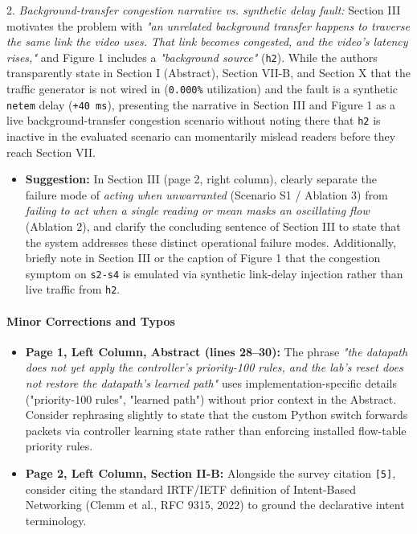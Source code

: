 \documentclass[11pt,a4paper]{article}
\begin{document}
2. \emph{Background-transfer congestion narrative vs. synthetic delay fault:} Section III motivates the problem with \emph{"an unrelated background transfer happens to traverse the same link the video uses. That link becomes congested, and the video's latency rises,"} and Figure 1 includes a \emph{"background source"} (\texttt{h2}). While the authors transparently state in Section I (Abstract), Section VII-B, and Section X that the traffic generator is not wired in (\texttt{0.000\%} utilization) and the fault is a synthetic \texttt{netem} delay (\texttt{+40 ms}), presenting the narrative in Section III and Figure 1 as a live background-transfer congestion scenario without noting there that \texttt{h2} is inactive in the evaluated scenario can momentarily mislead readers before they reach Section VII.
\begin{itemize}[leftmargin=1.8em,itemsep=2pt]
\item \textbf{Suggestion:} In Section III (page 2, right column), clearly separate the failure mode of \emph{acting when unwarranted} (Scenario S1 / Ablation 3) from \emph{failing to act when a single reading or mean masks an oscillating flow} (Ablation 2), and clarify the concluding sentence of Section III to state that the system addresses these distinct operational failure modes. Additionally, briefly note in Section III or the caption of Figure 1 that the congestion symptom on \texttt{s2-s4} is emulated via synthetic link-delay injection rather than live traffic from \texttt{h2}.
\end{itemize}
\paragraph{Minor Corrections and Typos}
\begin{itemize}[leftmargin=1.8em,itemsep=2pt]
\item \textbf{Page 1, Left Column, Abstract (lines 28–30):} The phrase \emph{"the datapath does not yet apply the controller's priority-100 rules, and the lab's reset does not restore the datapath's learned path"} uses implementation-specific details ("priority-100 rules", "learned path") without prior context in the Abstract. Consider rephrasing slightly to state that the custom Python switch forwards packets via controller learning state rather than enforcing installed flow-table priority rules.
\end{itemize}
\begin{itemize}[leftmargin=1.8em,itemsep=2pt]
\item \textbf{Page 2, Left Column, Section II-B:} Alongside the survey citation \texttt{[5]}, consider citing the standard IRTF/IETF definition of Intent-Based Networking (Clemm et al., RFC 9315, 2022) to ground the declarative intent terminology.
\end{itemize}
\end{document}

